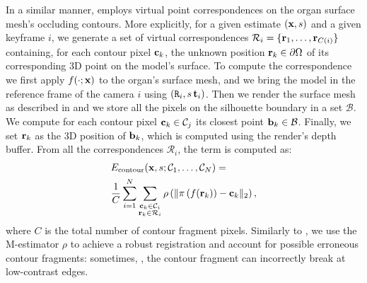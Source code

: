 In a similar manner, \Econtour employs virtual point correspondences on the organ surface mesh's occluding contours.
More explicitly, for a given estimate $(\mathbf{x},s)$ and a given keyframe $i$, we generate a set of virtual correspondences $\mathcal{R}_i=\{\mathbf{r}_1,\dots ,\mathbf{r}_{C(i)}\}$
containing, for each contour pixel $\mathbf{c}_k$, the unknown position $\mathbf{r}_k\in\partial \Omega$  of its corresponding 3D point on the model's surface.
To compute the correspondence we first apply $f(\cdot;\mathbf{x})$ to the organ's surface mesh, and we bring the model in the reference frame of the camera $i$ using $(\mat{R}_{i}, s\,\vet{t}_{i})$.
Then
we render the surface mesh as described in  and we store all the pixels on the silhouette boundary in a set $\mathcal{B}$. 
We compute for each contour pixel $\mathbf{c}_k\in \mathcal{C}_j$ its closest point $\mathbf{b}_k\in \mathcal{B}$.
Finally, we set $\mathbf{r}_k$ as the 3D position of $\mathbf{b}_k$, which is computed using the render's depth buffer.
From all the correspondences $\mathcal{R}_i$, the term \Econtour is computed as:
\begin{equation}
\label{eq:contour}
\begin{split}
 & \Econtour(\vet{x},s;\mathcal{C}_{1},\dots,\mathcal{C}_{N}) = \\ 
 &  \frac{1}{C}\sum_{i=1}^{N}\sum_{\substack{\vet{c}_{k}\in\mathcal{C}_{i}\\\vet{r}_{k}\in\mathcal{R}_{i}}}\rho\left(\|\pi\left(f(\vet{r}_{k})\right)-\vet{c}_{k}\|_{2}\right),
\end{split}
\end{equation}
\noindent where $C$ is the total number of contour fragment pixels.
Similarly to \Epoint, we use the M-estimator $\rho$ to achieve a robust registration and account for possible erroneous contour fragments: sometimes, \eg, 
the contour fragment can incorrectly break at low-contrast edges.

